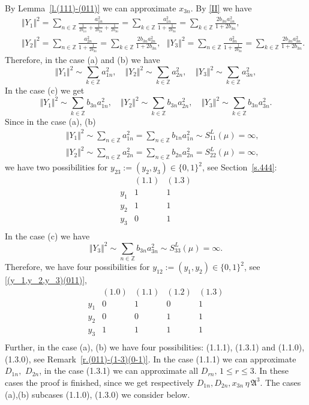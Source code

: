\documentclass[preprint,12pt]{elsarticle}
\numberwithin{equation}{section}
\begin{document}
By  Lemma~\ref{l.(111)-(011)} we can approximate $x_{3n}$.
By \eqref{II}  we have
\begin{eqnarray*}
 &&\Vert Y_1\Vert^2=\sum_{n\in \mathbb Z}\frac{a_{1n}^2}{\frac{1}{2b_{1n}}+\frac{1}{2b_{2n}}+\frac{1}{2b_{3n}}}= 
\sum_{k\in \mathbb Z}\frac{a_{1n}^2}{1
+\frac{1}{2b_{3n}}
}=\sum_{k\in \mathbb Z}\frac{2b_{3n}a_{1n}^2}{1+2b_{3n}},
\\
&&
\Vert Y_2 \Vert^2
\!=\!\sum_{n\in \mathbb Z}\frac{a_{2n}^2}{
1+\frac{1}{2b_{3n}}}\!=\!\sum_{k\in \mathbb Z}\frac{2b_{3n}a_{2n}^2}{1+2b_{3n}},
\,\,\,\,
\Vert Y_3\Vert^2
\!=\! \sum_{n\in \mathbb Z}\frac{a_{3n}^2}{
1+
\frac{1}{2b_{3n}}} \!=\!
\sum_{k\in \mathbb Z}\frac{2b_{3n}a_{3n}^2}{1+2b_{3n}}.
\end{eqnarray*}
Therefore, in the case (a) and (b) we have
$$
\Vert Y_1 \Vert^2\sim \sum_{k\in \mathbb Z}a_{1n}^2,
\quad 
\Vert Y_2 \Vert^2\sim \sum_{k\in \mathbb Z}a_{2n}^2,
\quad 
\Vert Y_3 \Vert^2\sim \sum_{k\in \mathbb Z}a_{3n}^2,
$$
In the case (c) we get
$$
\Vert Y_1 \Vert^2\sim \sum_{k\in \mathbb Z}b_{3n}a_{1n}^2,
\quad 
\Vert Y_2 \Vert^2\sim \sum_{k\in \mathbb Z}b_{3n}a_{2n}^2,
\quad 
\Vert Y_3 \Vert^2\sim
\sum_{k\in \mathbb Z}b_{3n}a_{3n}^2.
$$
Since in the case (a), (b)
\begin{eqnarray*}
 &&
\Vert Y_1 \Vert^2\sim
\sum_{n\in \mathbb Z}a_{1n}^2=
\sum_{n\in \mathbb Z}b_{1n}a_{1n}^2\sim S^L_{11}(\mu)=\infty,\\
&&
\Vert Y_2 \Vert^2\sim
\sum_{n\in \mathbb Z}a_{2n}^2=\sum_{n\in \mathbb Z}b_{2n}a_{2n}^2=S^L_{22}(\mu)=\infty,
\end{eqnarray*}
we have two possibilities for $y_{23}:=(y_2,y_3)\in \{0,1\}^2$, 
see Section~\ref{s.444}:
\begin{equation}
\begin{array}{ccccc}
   &(1.1)&(1.3)\\
y_1&1&1\\
y_2&1&1\\
y_3&0&1\\
\end{array}
\end{equation}
In the case (c) we have 
$$
\Vert Y_3 \Vert^2\sim
\sum_{n\in \mathbb Z}b_{3n}a_{3n}^2\sim S^L_{33}(\mu)=\infty.
$$ 
Therefore,
we have four possibilities 
for $y_{12}:=(y_1,y_2)\in \{0,1\}^2$, see \eqref{(y_1,y_2,y_3)(011)},
\begin{equation}
\begin{array}{ccccc}
   &(1.0)&(1.1)&(1.2)&(1.3)\\
y_1&0&1&0&1\\
y_2&0&0&1&1\\
y_3&1&1&1&1\\
\end{array}
\end{equation}
Further, in the case (a), (b) we have four possibilities: (1.1.1), (1.3.1) and (1.1.0), (1.3.0), see Remark~\ref{r.(011)-(1-3)(0-1)}. In the case
(1.1.1) we can approximate 
$D_{1n}, \,\,D_{2n}$, in the case  (1.3.1) we can approximate all $D_{rn},\,1\leq r\leq 3$. In these cases the proof is finished, since we get 
respectively $D_{1n}, D_{2n},x_{3n}\,\eta\, {\mathfrak A}^3$.
The cases (a),(b) subcases 
(1.1.0), (1.3.0)  we consider below.
\end{document}
